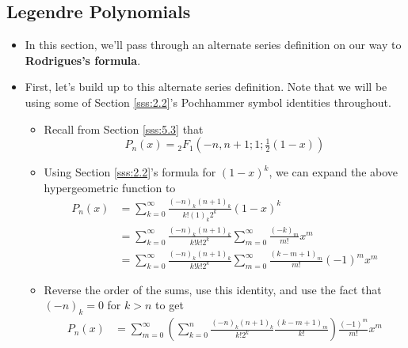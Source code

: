 \documentclass[../finalProject.tex]{subfiles}
\begin{document}
\subsection{Legendre Polynomials}
\begin{itemize}
    \item In this section, we'll pass through an alternate series definition on our way to \textbf{Rodrigues's formula}.
    \item First, let's build up to this alternate series definition. Note that we will be using some of Section \ref{sss:2.2}'s Pochhammer symbol identities throughout.
    \begin{itemize}
        \item Recall from Section \ref{sss:5.3} that
        \begin{equation*}
            P_n(x) = {}_2F_1(-n,n+1;1;\tfrac{1}{2}(1-x))
        \end{equation*}
        \item Using Section \ref{sss:2.2}'s formula for $(1-x)^k$, we can expand the above hypergeometric function to
        \begin{align*}
            P_n(x) &= \sum_{k=0}^\infty\frac{(-n)_k(n+1)_k}{k!(1)_k2^k}(1-x)^k\\
            &= \sum_{k=0}^\infty\frac{(-n)_k(n+1)_k}{k!k!2^k}\sum_{m=0}^\infty\frac{(-k)_m}{m!}x^m\\
            &= \sum_{k=0}^\infty\frac{(-n)_k(n+1)_k}{k!k!2^k}\sum_{m=0}^\infty\frac{(k-m+1)_m}{m!}(-1)^mx^m\tag*{Identity 2}
        \end{align*}
        \item Reverse the order of the sums, use this identity, and use the fact that $(-n)_k=0$ for $k>n$ to get
        \begin{align*}
            P_n(x) &= \sum_{m=0}^\infty\left( \sum_{k=0}^n\frac{(-n)_k(n+1)_k}{k!2^k}\frac{(k-m+1)_m}{k!} \right)\frac{(-1)^m}{m!}x^m\\

\end{align*}
\end{itemize}
\end{itemize}
\end{document}
